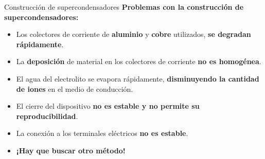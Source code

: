 \documentclass[aspectratio=169]{beamer}
\begin{document}
	\begin{frame}{Construcción de supercondensadores}
		\only<1->\textbf{Problemas con la construcción de supercondensadores:}
		\begin{itemize}[<+(1)->]
			\item Los colectores de corriente de \textbf{aluminio} y \textbf{cobre} utilizados, \textbf{se degradan rápidamente}.
			\item La \textbf{deposición} de material en los colectores de corriente \textbf{no es homogénea}.
			\item El agua del electrolito se evapora rápidamente, \textbf{disminuyendo la cantidad de iones} en el medio de conducción. 
			\item El cierre del dispositivo \textbf{no es estable y no permite su reproducibilidad}.
			\item La conexión a los terminales eléctricos \textbf{no es estable}.
			\item[] \color{red} {\large \textbf{¡Hay que buscar otro método!}}
		\end{itemize}
	\end{frame}
\end{document}
